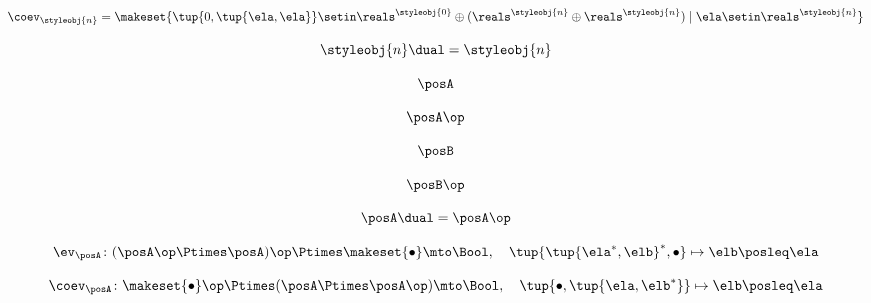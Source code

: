 {\begin{forslides}
        \begin{equation}
            \label{eq:slides_trace_monoidal_20}
            \coev_\styleobj{n} = \makeset{\tup{0, \tup{\ela, \ela}} \setin \reals^\styleobj{0} \oplus (\reals^\styleobj{n} \oplus \reals^\styleobj{n}) \mid \ela \setin \reals^\styleobj{n}}
        \end{equation}

        \begin{equation}
            \label{eq:slides_trace_monoidal_21}
            \styleobj{n}\dual = \styleobj{n}
        \end{equation}

        \begin{equation}
            \label{eq:slides_trace_monoidal_22}
            \posA
        \end{equation}

        \begin{equation}
            \label{eq:slides_trace_monoidal_23}
            \posA\op
        \end{equation}

        \begin{equation}
            \label{eq:slides_trace_monoidal_24}
            \posB
        \end{equation}

        \begin{equation}
            \label{eq:slides_trace_monoidal_25}
            \posB\op
        \end{equation}

        \begin{equation}
            \label{eq:slides_trace_monoidal_26}
            \posA\dual = \posA\op
        \end{equation}

        \begin{equation}
            \label{eq:slides_trace_monoidal_27}
            \ev_\posA \colon (\posA\op \Ptimes \posA)\op \Ptimes \makeset{\bullet} \mto \Bool, \quad \tup{\tup{\ela^*, \elb}^*, \bullet} \mapsto \elb \posleq \ela
        \end{equation}

        \begin{equation}
            \label{eq:slides_trace_monoidal_28}
            \coev_\posA \colon \makeset{\bullet}\op \Ptimes (\posA \Ptimes \posA\op)   \mto \Bool, \quad \tup{\bullet, \tup{\ela, \elb^*}} \mapsto \elb \posleq \ela
        \end{equation}


\end{forslides}}
